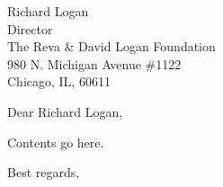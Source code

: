 \documentclass[11pt]{letter}
\begin{document}
\begin{letter}{
    Richard Logan \\
    Director \\
    The Reva \& David Logan Foundation \\
    980 N. Michigan Avenue \#1122 \\
    Chicago, IL, 60611
  }
  \opening{Dear Richard Logan,}

  Contents go here.

  \closing{
    Best regards, \\
     \\
  }
\end{letter}
\end{document}
